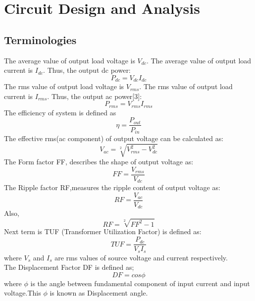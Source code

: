 

\chapter{Circuit Design and Analysis} %
\label{Chapter3}
\section{Terminologies}
The average value of output load voltage is $V_{dc}$.
The average value of output load current is $I_{dc}$.
Thus, the output dc power:
$$P_{dc}=V_{dc}I_{dc}$$ 
The rms value of output load voltage is $V_{rms}$.
The rms value of output load current is $I_{rms}$.
Thus, the output ac power[3]:
\begin{equation}
P_{rms}=V_{rms}I_{rms}
\end{equation}
The efficiency of system is defined as
\begin{equation}
 \eta=\frac{P_{out}}{P_{in}}
\end{equation}
The effective rms(ac component) of output voltage can be calculated as:
\begin{equation}
V_{ac}=\sqrt[2]{V_{rms}^2-V_{dc}^2}
\end{equation}
The Form factor FF, describes the shape of output voltage as:
\begin{equation}
FF=\frac{V_{rms}}{V_{dc}}
\end{equation}
The Ripple factor RF,measures the ripple content of output voltage as:
\begin{equation}
RF=\frac{V_{ac}}{V_{dc}}
\end{equation}
Also,\\
\begin{equation}
RF=\sqrt[2]{FF^2-1}
\end{equation}
Next term is TUF (Transformer Utilization Factor) is defined as:
\begin{equation}
TUF=\frac{P_{dc}}{V_sI_s}
\end{equation}
where $V_s$ and $I_s$ are rms values of source voltage and current respectively.\\
The Displacement Factor DF is defined as;
\begin{equation}
DF=cos\phi
\end{equation}
where $\phi$ is the angle between fundamental component of input current and input voltage.This $\phi$ is known as Displacement angle.\\
